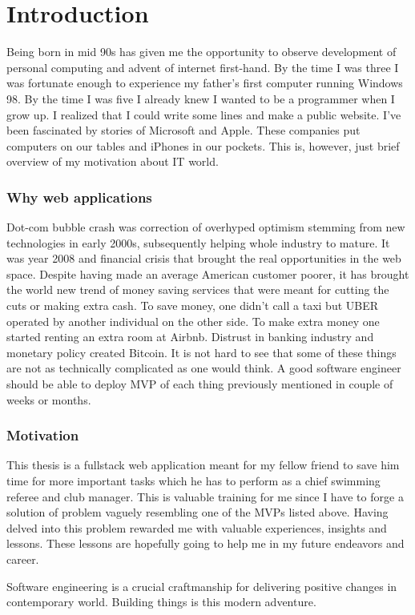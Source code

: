 \chapter*{Introduction}
\par
Being born in mid 90s has given me the  opportunity to observe development of personal computing and advent of internet first-hand. By the time I was three I was fortunate enough to experience my father's first computer running Windows 98. By the time I was five I already knew I wanted to be a programmer when I grow up. I realized that I could write some lines and make a public website. I've been fascinated by stories of Microsoft and Apple. These companies put computers on our tables and iPhones in our pockets. This is, however, just brief overview of my motivation about IT world.
\subsection*{Why web applications}
\par
 Dot-com bubble crash was correction of overhyped optimism stemming from new technologies in early 2000s, subsequently helping whole industry to mature. It was year 2008 and financial crisis that brought the real opportunities in the web space. Despite having made an average American customer poorer, it has brought the world new trend of money saving services that were meant for cutting the cuts or making extra cash. To save money, one didn't call a taxi but UBER operated by another individual on the other side. To make extra money one started renting an extra room at Airbnb. Distrust in banking industry and monetary policy created Bitcoin. It is not hard to see that some of these things are not as technically complicated as one would think. A good software engineer should be able to deploy MVP of each thing previously mentioned in couple of weeks or months.
\subsection*{Motivation}
\par
This thesis is a fullstack web application meant for my fellow friend to save him time for more important tasks which he has to perform as a chief swimming referee and club manager. This is valuable training for me since I have to forge a solution of problem vaguely resembling one of the MVPs listed above. Having delved into this problem rewarded me with valuable experiences, insights and lessons. These lessons are hopefully going to help me in my future endeavors and career.
\par
Software engineering is a crucial craftmanship for delivering positive changes in contemporary world. Building things is this modern adventure.
